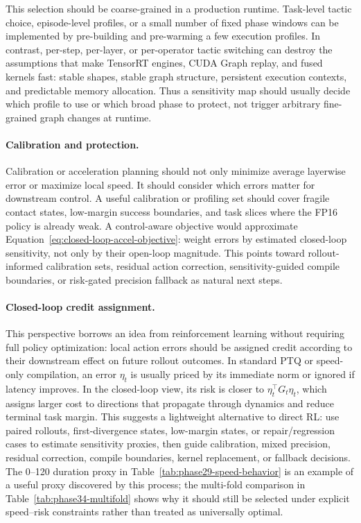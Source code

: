 \documentclass[10pt]{article}
\begin{document}
This selection should be coarse-grained in a production runtime. Task-level tactic choice, episode-level profiles, or a small number of fixed phase windows can be implemented by pre-building and pre-warming a few execution profiles. In contrast, per-step, per-layer, or per-operator tactic switching can destroy the assumptions that make TensorRT engines, CUDA Graph replay, and fused kernels fast: stable shapes, stable graph structure, persistent execution contexts, and predictable memory allocation. Thus a sensitivity map should usually decide which profile to use or which broad phase to protect, not trigger arbitrary fine-grained graph changes at runtime.

\paragraph{Calibration and protection.}
Calibration or acceleration planning should not only minimize average layerwise error or maximize local speed. It should consider which errors matter for downstream control. A useful calibration or profiling set should cover fragile contact states, low-margin success boundaries, and task slices where the FP16 policy is already weak. A control-aware objective would approximate Equation~\ref{eq:closed-loop-accel-objective}: weight errors by estimated closed-loop sensitivity, not only by their open-loop magnitude. This points toward rollout-informed calibration sets, residual action correction, sensitivity-guided compile boundaries, or risk-gated precision fallback as natural next steps.

\paragraph{Closed-loop credit assignment.}
This perspective borrows an idea from reinforcement learning without requiring full policy optimization: local action errors should be assigned credit according to their downstream effect on future rollout outcomes. In standard PTQ or speed-only compilation, an error $\eta_t$ is usually priced by its immediate norm or ignored if latency improves. In the closed-loop view, its risk is closer to $\eta_t^\top G_t\eta_t$, which assigns larger cost to directions that propagate through dynamics and reduce terminal task margin. This suggests a lightweight alternative to direct RL: use paired rollouts, first-divergence states, low-margin states, or repair/regression cases to estimate sensitivity proxies, then guide calibration, mixed precision, residual correction, compile boundaries, kernel replacement, or fallback decisions. The 0--120 duration proxy in Table~\ref{tab:phase29-speed-behavior} is an example of a useful proxy discovered by this process; the multi-fold comparison in Table~\ref{tab:phase34-multifold} shows why it should still be selected under explicit speed--risk constraints rather than treated as universally optimal.
\end{document}

